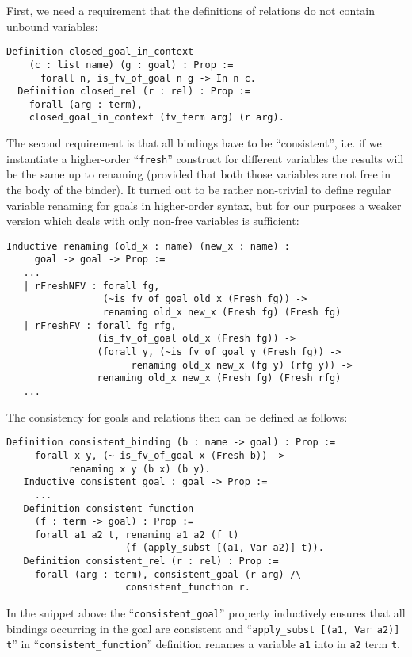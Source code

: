 First, we need a requirement that the definitions of relations do not contain unbound variables:

\begin{lstlisting}[language=Coq] 
  Definition closed_goal_in_context 
    (c : list name) (g : goal) : Prop :=
      forall n, is_fv_of_goal n g -> In n c.
  Definition closed_rel (r : rel) : Prop :=
    forall (arg : term),
    closed_goal_in_context (fv_term arg) (r arg).
\end{lstlisting}

The second requirement is that all bindings have to be ``consistent'', i.e. if we instantiate a higher-order ``\lstinline|fresh|''
construct for different variables the results will be the same up to renaming (provided that both those variables are not free in
the body of the binder). It turned out to be rather non-trivial to define regular variable renaming for goals in higher-order syntax, but for our purposes
a weaker version which deals with only non-free variables is sufficient:

\begin{lstlisting}[language=Coq]
   Inductive renaming (old_x : name) (new_x : name) :
     goal -> goal -> Prop :=
   ...
   | rFreshNFV : forall fg,
                 (~is_fv_of_goal old_x (Fresh fg)) ->
                 renaming old_x new_x (Fresh fg) (Fresh fg)
   | rFreshFV : forall fg rfg,
                (is_fv_of_goal old_x (Fresh fg)) ->
                (forall y, (~is_fv_of_goal y (Fresh fg)) ->
                      renaming old_x new_x (fg y) (rfg y)) ->
                renaming old_x new_x (Fresh fg) (Fresh rfg)
   ...
\end{lstlisting}

The consistency for goals and relations then can be defined as follows:

\begin{lstlisting}[language=Coq]
   Definition consistent_binding (b : name -> goal) : Prop :=
     forall x y, (~ is_fv_of_goal x (Fresh b)) ->
           renaming x y (b x) (b y).
   Inductive consistent_goal : goal -> Prop :=
     ...
   Definition consistent_function
     (f : term -> goal) : Prop :=
     forall a1 a2 t, renaming a1 a2 (f t)
                     (f (apply_subst [(a1, Var a2)] t)).
   Definition consistent_rel (r : rel) : Prop :=
     forall (arg : term), consistent_goal (r arg) /\
                     consistent_function r.
\end{lstlisting}

In the snippet above the ``\lstinline[language=Coq]{consistent_goal}'' property inductively ensures that all bindings occurring
in the goal are consistent and ``\lstinline[language=Coq]{apply_subst [(a1, Var a2)] t}'' in ``\lstinline[language=Coq]{consistent_function}''
definition renames a variable \lstinline[language=Coq]{a1} into in \lstinline[language=Coq]{a2} term \lstinline[language=Coq]{t}.

